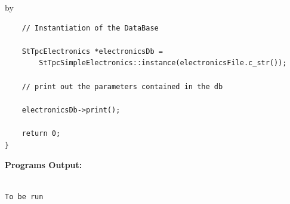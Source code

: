 \documentclass[twoside]{article}
\newcommand{\entrylabel}[1]{\mbox{\textbf{{#1}}}\hfil}%
\newenvironment{entry}
{\begin{list}{}%
    {\renewcommand{\makelabel}{\entrylabel}%
     \setlength{\labelwidth}{90pt}%
     \setlength{\leftmargin}{\labelwidth}
     \advance\leftmargin by \labelsep%
      }%
    }%
  {\end{list}}
\newcommand{\Entrylabel}[1]%
{\raisebox{0pt}[1ex][0pt]{\makebox[\labelwidth][l]%
    {\parbox[t]{\labelwidth}{\hspace{0pt}\textbf{{#1}}}}}}
\newenvironment{Entry}%
{\renewcommand{\entrylabel}{\Entrylabel}\begin{entry}}%
  {\end{entry}}
\begin{document}
\begin{Entry}
{\begin{verbatim}
    // Instantiation of the DataBase

    StTpcElectronics *electronicsDb =
        StTpcSimpleElectronics::instance(electronicsFile.c_str());

    // print out the parameters contained in the db

    electronicsDb->print();    
    
    return 0;
}
\end{verbatim}
}%
{\bf Programs Output:}
{\footnotesize
\begin{verbatim}

To be run

\end{verbatim}
} %

\end{Entry}
\clearpage

%
%
\end{document}
